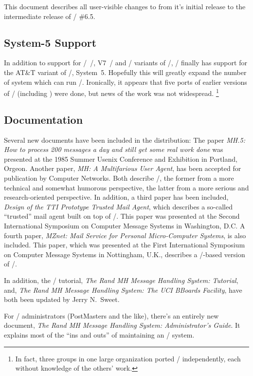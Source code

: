 This document describes all user-visible changes to  from it's initial
release to the intermediate release of \MH/ \#6.5.

\subsection*	{System-5 Support}
In addition to support for \bsd/~\unix/, V7~\unix/ and \xenix/ variants of
\unix/,
\MH/ finally has support for the AT\&T variant of \unix/, System~5.
Hopefully this will greatly expand the number of system which can run \MH/.
Ironically,
it appears that five ports of earlier versions of \MH/ (including )
were done,
but news of the work was not widespread.%
\footnote{In fact,
three groups in one large organization ported \MH/ independently,
each without knowledge of the others' work.}

\subsection*	{Documentation}
Several new documents have been included in the  distribution:
The paper {\em MH.5: How to process 200 messages a day and still get some
real work done}
was presented at the 1985 Summer Usenix Conference and Exhibition in
Portland, Orgeon.
Another paper, {\em MH: A Multifarious User Agent},
has been accepted for publication by Computer Networks.
Both describe \MH/,
the former from a more technical and somewhat humorous perspective,
the latter from a more serious and research-oriented perspective.
In addition,
a third paper has been included,
{\em Design of the TTI Prototype Trusted Mail Agent},
which describes a so-called ``trusted'' mail agent built on top of \MH/.
This paper was presented at the Second International Symposium on
Computer Message Systems in Washington, D.C.
A fourth paper,
{\em MZnet: Mail Service for Personal Micro-Computer Systems},
is also included.
This paper,
which was presented at the First International Symposium on Computer Message
Systems in Nottingham, U.K.,
describes a \cpm/-based version of \MH/.

In addition,
the \MH/ tutorial, {\em The Rand MH Message Handling System: Tutorial},
and,
{\em The Rand MH Message Handling System: The UCI BBoards Facility},
have both been updated by Jerry N.~Sweet.

For \MH/ administrators (PostMasters and the like),
there's an entirely new document,
{\em The Rand MH Message Handling System: Administrator's Guide}.
It explains most of the ``ins and outs'' of maintaining an \MH/ system.

